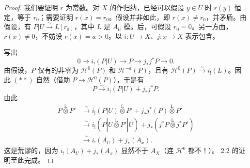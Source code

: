 \begin{proof}
我们要证明 $r$ 为常数。对 $X$ 的作归纳，已经可以假设 $y\in U$ 时 $r(y)$ 恒定，等于 $r_0$；需要证明 $r(x)=r_0$。假设并非如此，即 $r(x)\ne r_0$，并矛盾。由假设，有 $P|U\xrightarrow{\sim}L[r_0]$，其中 $L$ 是 $A_U$ 模。后，可假设 $r_0=0$。另一方面，$r(x)\ne0$，不妨设 $r(x)=a>0$。以 $i:U\longrightarrow X$、$j:x\longrightarrow X$ 表示包含。

写出
\[
 0\longrightarrow i_!(P|U)\longrightarrow P\longrightarrow j_*j^*P\longrightarrow0.\tag{**}
\]
由假设，$P$ 仅有的非零为 $\mathcal H^0(P)$ 和 $\mathcal H^{-a}(P)$，且有 $\mathcal H^0(P)\xrightarrow{\sim}i_!(L)$。因此 $(**)$ 自然（借助 $P\longrightarrow\mathcal H^0(P)$），于是有
\[
 P\xrightarrow{\sim}i_!(P|U)+j_*j^*P.
\]
由此
\[
 \begin{aligned}
 P\mathbin{\overset{\mathrm L}{\otimes}}P'
 &\xrightarrow{\sim}i_!(P|U)\mathbin{\overset{\mathrm L}{\otimes}}P'
       +j_*j^*(P)\mathbin{\overset{\mathrm L}{\otimes}}P'\\
 &\xrightarrow{\sim}i_!(P|U\mathbin{\overset{\mathrm L}{\otimes}}P'|U)
       +j_*(j^*P\mathbin{\overset{\mathrm L}{\otimes}}j^*P')\\
 &\xrightarrow{\sim}i_!(A_U)+j_*(A_x).
 \end{aligned}
\]
这是荒谬的，因为 $i_!(A_U)+j_*(A_x)$ 显然不于 $A_X$（连 $\mathcal H^0$ 都不！）。 2.2 的证明至此完成。
\end{proof}
